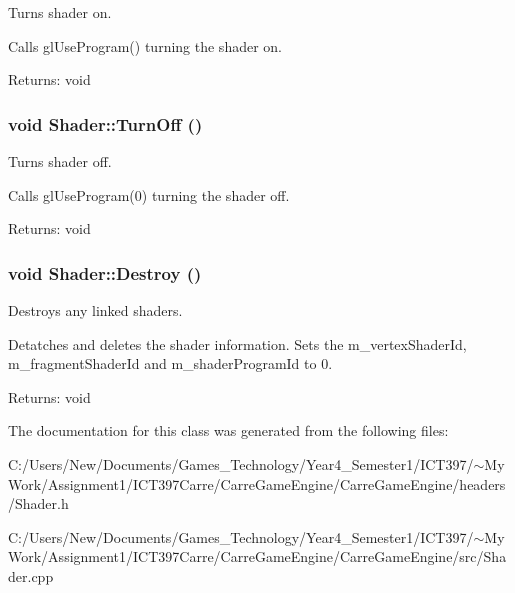 Turns shader on. 

Calls glUseProgram() turning the shader on.

\begin{Desc}
\item[Returns:]void \end{Desc}
\hypertarget{class_shader_d94b005141a4ed31a3f4f801455e5590}{
\subsubsection[TurnOff]{\setlength{\rightskip}{0pt plus 5cm}void Shader::TurnOff ()}}
\label{class_shader_d94b005141a4ed31a3f4f801455e5590}


Turns shader off. 

Calls glUseProgram(0) turning the shader off.

\begin{Desc}
\item[Returns:]void \end{Desc}
\hypertarget{class_shader_b6fc1a824cb122fcb0c902397e20f72f}{
\subsubsection[Destroy]{\setlength{\rightskip}{0pt plus 5cm}void Shader::Destroy ()}}
\label{class_shader_b6fc1a824cb122fcb0c902397e20f72f}


Destroys any linked shaders. 

Detatches and deletes the shader information. Sets the m\_\-vertexShaderId, m\_\-fragmentShaderId and m\_\-shaderProgramId to 0.

\begin{Desc}
\item[Returns:]void \end{Desc}


The documentation for this class was generated from the following files:\begin{CompactItemize}
\item 
C:/Users/New/Documents/Games\_\-Technology/Year4\_\-Semester1/ICT397/$\sim$My Work/Assignment1/ICT397Carre/CarreGameEngine/CarreGameEngine/headers/Shader.h\item 
C:/Users/New/Documents/Games\_\-Technology/Year4\_\-Semester1/ICT397/$\sim$My Work/Assignment1/ICT397Carre/CarreGameEngine/CarreGameEngine/src/Shader.cpp\end{CompactItemize}
